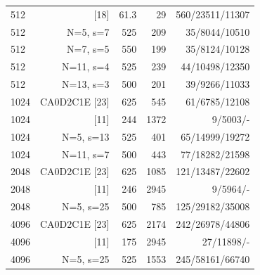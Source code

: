\begin{longtable}{lrrrr}
{512} & {[18]} & {61.3} & {29} & {560/23511/11307} \\
{512} & {N=5, s=7} & {525} & {209} & {35/8044/10510} \\
{512} & {N=7, s=5} & {550} & {199} & {35/8124/10128} \\
{512} & {N=11, s=4} & {525} & {239} & {44/10498/12350} \\
{512} & {N=13, s=3} & {500} & {201} & {39/9266/11033} \\
{1024} & {CA0D2C1E [23]} & {625} & {545} & {61/6785/12108} \\
{1024} & {[11]} & {244} & {1372} & {9/5003/-} \\
{1024} & {N=5, s=13} & {525} & {401} & {65/14999/19272} \\
{1024} & {N=11, s=7} & {500} & {443} & {77/18282/21598} \\
{2048} & {CA0D2C1E [23]} & {625} & {1085} & {121/13487/22602} \\
{2048} & {[11]} & {246} & {2945} & {9/5964/-} \\
{2048} & {N=5, s=25} & {500} & {785} & {125/29182/35008} \\
{4096} & {CA0D2C1E [23]} & {625} & {2174} & {242/26978/44806} \\
{4096} & {[11]} & {175} & {2945} & {27/11898/-} \\
{4096} & {N=5, s=25} & {525} & {1553} & {245/58161/66740} \\
\end{longtable}
\endgroup
\begingroup
\small
\setlength{\tabcolsep}{3pt}
\setlength{\LTcapwidth}{\textwidth}
